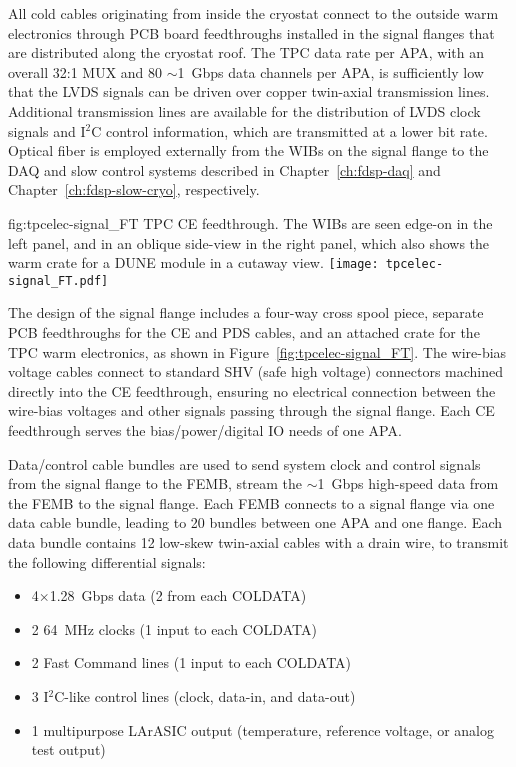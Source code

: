 All cold cables originating from inside the cryostat connect to the outside warm electronics through PCB board feedthroughs
installed in the signal flanges that are distributed along the cryostat roof.
The TPC data rate per APA, with an overall 32:1 MUX and 80 $\sim$1~Gbps data channels per APA,
is sufficiently low that the LVDS signals can be driven over copper twin-axial transmission lines.
Additional transmission lines are available for the distribution of LVDS clock signals and I$^2$C control information,
which are transmitted at a lower bit rate.
Optical fiber is employed externally from the WIBs on the signal flange to the DAQ and slow control systems described in Chapter~\ref{ch:fdsp-daq} and Chapter~\ref{ch:fdsp-slow-cryo}, respectively.

\begin{dunefigure}
{fig:tpcelec-signal_FT}
{TPC CE feedthrough. The WIBs are seen edge-on in the left panel, and in an oblique side-view in the right panel, which also shows the warm crate for a DUNE module in a cutaway view.}
\texttt{[image: tpcelec-signal\_FT.pdf]}
\end{dunefigure}

The design of the signal flange includes a four-way cross spool piece, separate PCB feedthroughs for the CE and PDS cables, and
an attached crate for the TPC warm electronics, as shown in Figure~\ref{fig:tpcelec-signal_FT}.
The wire-bias voltage cables connect to standard SHV (safe high voltage) connectors machined directly into the CE feedthrough,
ensuring no electrical connection between the wire-bias voltages and other signals passing through the signal flange.
Each CE feedthrough serves the bias/power/digital IO needs of one APA.  

Data/control cable bundles are used to send system clock and control signals from the 
signal flange to the FEMB, stream the $\sim$1~Gbps high-speed data from the FEMB to the signal flange.  Each FEMB 
connects to a signal flange via one data cable bundle, leading to 20 bundles between one APA and one flange.  Each data bundle contains 12 low-skew twin-axial cables with a drain wire, 
to transmit the following differential signals:

\begin{itemize}
    \item 4$\times$1.28~Gbps data (2 from each COLDATA)
    \item 2 64~MHz clocks (1 input to each COLDATA)
    \item 2 Fast Command lines (1 input to each COLDATA)
    \item 3 I$^2$C-like control lines (clock, data-in, and data-out)
    \item 1 multipurpose LArASIC output (temperature, reference voltage, or analog test output)
\end{itemize}

